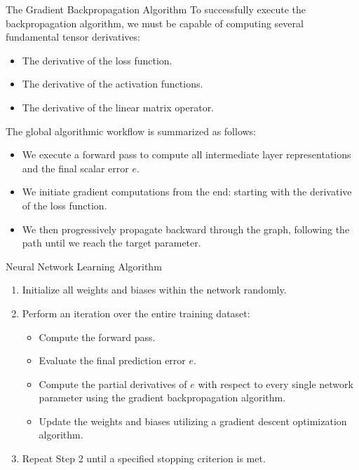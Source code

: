 \begin{frame}{The Gradient Backpropagation Algorithm}
	To successfully execute the backpropagation algorithm, we must be capable of computing several fundamental tensor derivatives:
	\begin{itemize}
		\item The derivative of the loss function.
		\item The derivative of the activation functions.
		\item The derivative of the linear matrix operator.
	\end{itemize}
	\vspace{0.3cm}
	\pause
	The global algorithmic workflow is summarized as follows:
	\begin{itemize}
		\item We execute a forward pass to compute all intermediate layer representations and the final scalar error $e$.
		\pause
		\item We initiate gradient computations from the end: starting with the derivative of the loss function.
		\pause
		\item We then progressively propagate backward through the graph, following the path until we reach the target parameter.
	\end{itemize}
\end{frame}

\begin{frame}{Neural Network Learning Algorithm}
	\begin{enumerate}
		\item Initialize all weights and biases within the network randomly.
		\pause
		\item Perform an iteration over the entire training dataset:
		\pause
		\begin{itemize}
			\item Compute the forward pass.
			\pause
			\item Evaluate the final prediction error $e$.
			\pause
			\item Compute the partial derivatives of $e$ with respect to every single network parameter using the gradient backpropagation algorithm.
			\pause
			\item Update the weights and biases utilizing a gradient descent optimization algorithm.
		\end{itemize}
		\pause 
		\item Repeat Step 2 until a specified stopping criterion is met.
	\end{enumerate}
\end{frame}

